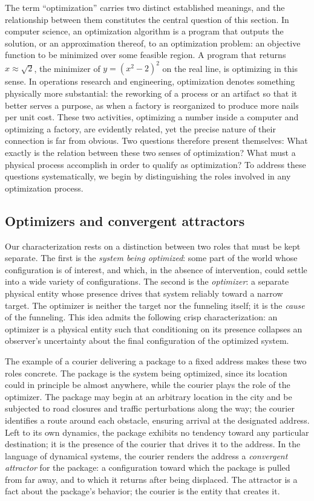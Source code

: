 \documentclass[10pt]{article}
\theoremstyle{definition}
\theoremstyle{remark}
\begin{document}
The term ``optimization'' carries two distinct established meanings, and the relationship between them constitutes the central question of this section. In computer science, an optimization algorithm is a program that outputs the solution, or an approximation thereof, to an optimization problem: an objective function to be minimized over some feasible region. A program that returns $x \approx \sqrt 2$, the minimizer of $y = (x^2 - 2)^2$ on the real line, is optimizing in this sense. In operations research and engineering, optimization denotes something physically more substantial: the reworking of a process or an artifact so that it better serves a purpose, as when a factory is reorganized to produce more nails per unit cost. These two activities, optimizing a number inside a computer and optimizing a factory, are evidently related, yet the precise nature of their connection is far from obvious. Two questions therefore present themselves: What exactly is the relation between these two senses of optimization? What must a physical process accomplish in order to qualify as optimization? To address these questions systematically, we begin by distinguishing the roles involved in any optimization process.

\subsection{Optimizers and convergent attractors}
\label{sec:attractor}

Our characterization rests on a distinction between two roles that must be kept separate. The first is the \emph{system being optimized}: some part of the world whose configuration is of interest, and which, in the absence of intervention, could settle into a wide variety of configurations. The second is the \emph{optimizer}: a separate physical entity whose presence drives that system reliably toward a narrow target. The optimizer is neither the target nor the funneling itself; it is the \emph{cause} of the funneling. This idea admits the following crisp characterization: an optimizer is a physical entity such that conditioning on its presence collapses an observer's uncertainty about the final configuration of the optimized system.

The example of a courier delivering a package to a fixed address makes these two roles concrete. The package is the system being optimized, since its location could in principle be almost anywhere, while the courier plays the role of the optimizer. The package may begin at an arbitrary location in the city and be subjected to road closures and traffic perturbations along the way; the courier identifies a route around each obstacle, ensuring arrival at the designated address. Left to its own dynamics, the package exhibits no tendency toward any particular destination; it is the presence of the courier that drives it to the address. In the language of dynamical systems, the courier renders the address a \emph{convergent attractor} for the package: a configuration toward which the package is pulled from far away, and to which it returns after being displaced. The attractor is a fact about the package's behavior; the courier is the entity that creates it.
\end{document}
